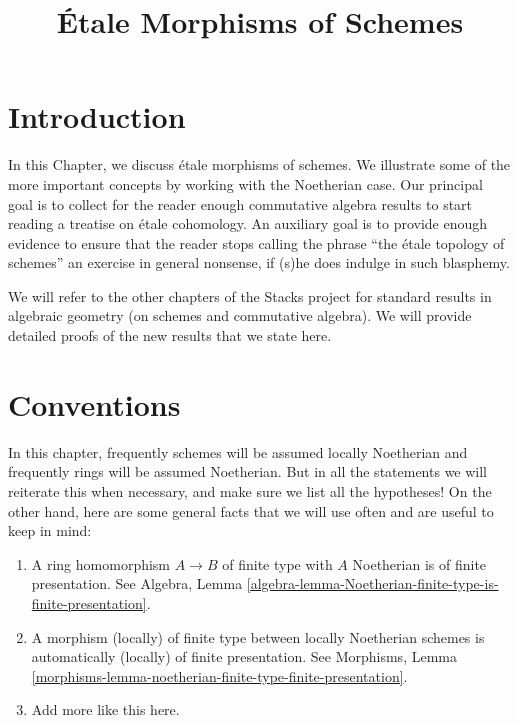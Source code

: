 

%


\title{\'Etale Morphisms of Schemes}

\maketitle

\label{section-phantom}

\tableofcontents



\section{Introduction}
\label{section-introduction}

\noindent
In this Chapter, we discuss \'etale morphisms of schemes. We illustrate
some of the more important concepts by working with the Noetherian case.
Our principal goal is to collect for the reader enough commutative
algebra results to start reading a treatise on \'etale cohomology. An
auxiliary goal is to provide enough evidence to ensure that the reader stops
calling the phrase ``the \'etale topology of schemes'' an exercise in general
nonsense, if (s)he does indulge in such blasphemy.

\medskip\noindent
We will refer to the other
chapters of the Stacks project for standard results in algebraic geometry
(on schemes and commutative algebra). We will provide detailed
proofs of the new results that we state here.




\section{Conventions}
\label{section-conventions}

\noindent
In this chapter, frequently schemes will be assumed locally Noetherian
and frequently rings will be assumed Noetherian. But in all the statements
we will reiterate this when necessary, and make sure we list all the
hypotheses! On the other hand, here are some general facts that we will use
often and are useful to keep in mind:
\begin{enumerate}
\item A ring homomorphism $A \to B$ of finite type with $A$ Noetherian
is of finite presentation. See Algebra,
Lemma \ref{algebra-lemma-Noetherian-finite-type-is-finite-presentation}.
\item A morphism (locally) of finite type between locally Noetherian schemes
is automatically (locally) of finite presentation.
See Morphisms,
Lemma \ref{morphisms-lemma-noetherian-finite-type-finite-presentation}.
\item Add more like this here.
\end{enumerate}




